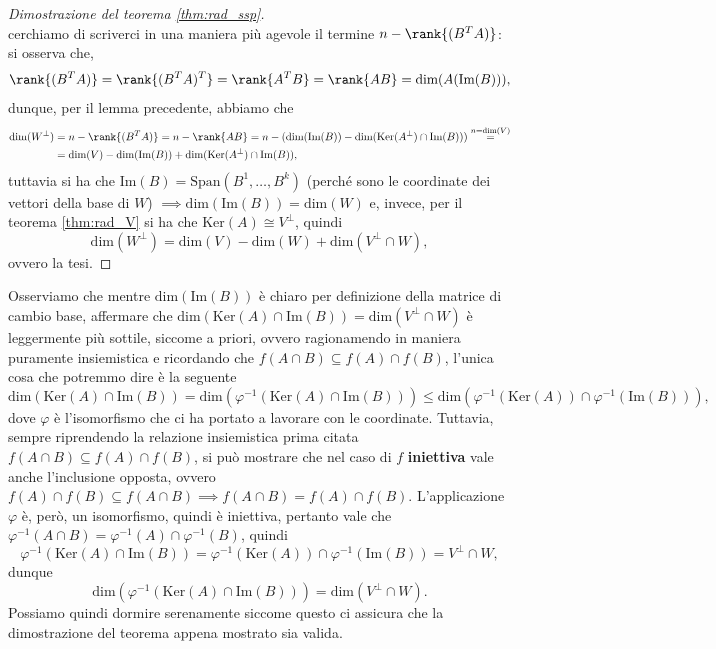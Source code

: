 \begin{proof}[Dimostrazione del teorema \ref{thm:rad_ssp}]
$$	$$
	cerchiamo di scriverci in una maniera più agevole il termine $n - \rank{(B^T A)}$: si osserva che, 
	$$
		\rank{(B^T A)} = \rank{(B^T A)^T} = \rank{A^T B} = \rank{AB} = \text{dim}(A(\text{Im}(B))),
	$$
	dunque, per il lemma precedente, abbiamo che
	\begin{align}
		\text{dim}(W^\perp) &= n - \rank{(B^T A)} = n - \rank{AB} = n - (\text{dim}(\text{Im}(B)) - \text{dim}(\text{Ker}(A^\perp) \cap \text{Im}(B))) \stackrel{n=\text{dim}(V)}{=} \\
		&= \text{dim}(V) - \text{dim}(\text{Im}(B)) + \text{dim}(\text{Ker}(A^\perp) \cap \text{Im}(B)),
	\end{align}
	tuttavia si ha che $\text{Im}(B) = \text{Span}(B^1, \ldots, B^k)$ (perché sono le coordinate dei vettori della base di $W$) $\implies \text{dim}(\text{Im}(B)) = \text{dim}(W)$ e, invece, per il teorema \ref{thm:rad_V} si ha che $\text{Ker}(A) \cong V^\perp$, quindi
	$$
		\text{dim}(W^\perp) = \text{dim}(V) - \text{dim}(W) + \text{dim}(V^\perp \cap W),
	$$
	ovvero la tesi.
\end{proof}
\begin{remark}
	Osserviamo che mentre $\text{dim}(\text{Im}(B))$ è chiaro per definizione della matrice di cambio base, affermare che $\text{dim}(\text{Ker}(A) \cap \text{Im}(B)) = \text{dim}(V^\perp \cap W)$ è leggermente più sottile, siccome a priori, ovvero ragionamendo in maniera puramente insiemistica e ricordando che $f(A \cap B) \subseteq f(A) \cap f(B)$, l'unica cosa che potremmo dire è la seguente
	$$
		\text{dim}(\text{Ker}(A) \cap \text{Im}(B)) = \text{dim}(\varphi^{-1}(\text{Ker}(A) \cap \text{Im}(B))) \leq \text{dim}(\varphi^{-1}(\text{Ker}(A)) \cap \varphi^{-1}(\text{Im}(B))),
	$$
	dove $\varphi$ è l'isomorfismo che ci ha portato a lavorare con le coordinate. Tuttavia, sempre riprendendo la relazione insiemistica prima citata $f(A \cap B) \subseteq f(A) \cap f(B)$, si può mostrare che nel caso di $f$ \textbf{iniettiva} vale anche l'inclusione opposta, ovvero $f(A) \cap f(B) \subseteq f(A \cap B) \implies f(A \cap B) = f(A) \cap f(B)$. L'applicazione $\varphi$ è, però, un isomorfismo, quindi è iniettiva, pertanto vale che $\varphi^{-1}(A \cap B) = \varphi^{-1}(A) \cap \varphi^{-1}(B)$, quindi
	$$
		\varphi^{-1}(\text{Ker}(A) \cap \text{Im}(B)) = \varphi^{-1}(\text{Ker}(A)) \cap \varphi^{-1}(\text{Im}(B)) = V^\perp \cap W,
	$$
	dunque
	$$
		\text{dim}(\varphi^{-1}(\text{Ker}(A) \cap \text{Im}(B))) = \text{dim}(V^\perp \cap W).
	$$
	Possiamo quindi dormire serenamente siccome questo ci assicura che la dimostrazione del teorema appena mostrato sia valida.
\end{remark}
